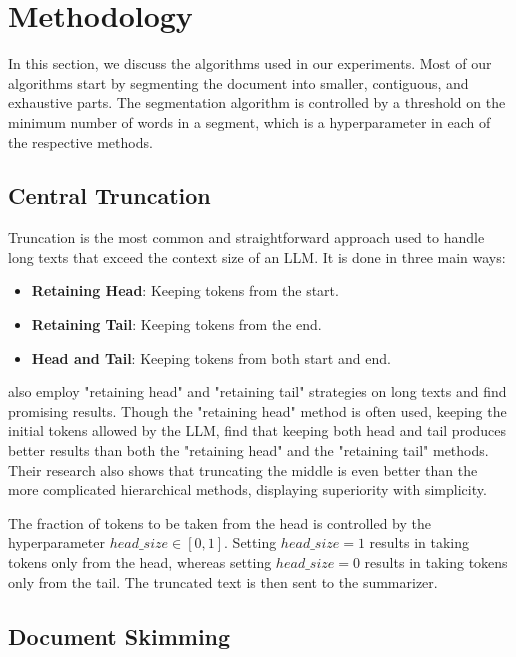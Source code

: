 \section{Methodology}
	\label{sec:methodology}

	In this section, we discuss the algorithms used in our experiments.
	Most of our algorithms start by segmenting the document into smaller, contiguous, and
	exhaustive parts.
	The segmentation algorithm is controlled by a threshold on the minimum number of words
	in a segment, which is a hyperparameter in each of the respective methods.


	\subsection{Central Truncation}
		\label{method:truncation}

		Truncation is the most common and straightforward approach used to handle long texts
		that exceed the context size of an LLM.
		It is done in three main ways:

		\begin{itemize}
			\item \textbf{Retaining Head}: Keeping tokens from the start.
			\item \textbf{Retaining Tail}: Keeping tokens from the end.
			\item \textbf{Head and Tail}: Keeping tokens from both start and end.
		\end{itemize}

		\citet{worsham-kalita-2018-genre} also employ "retaining head" and "retaining tail"
		strategies on long texts and find promising results.
		Though the "retaining head" method is often used, keeping the initial tokens allowed by
		the LLM, \citet{sun2019fine} find that keeping both head and tail produces better results
		than both the "retaining head" and the "retaining tail" methods.
		Their research also shows that truncating the middle is even better than the more
		complicated hierarchical methods, displaying superiority with simplicity.

		The fraction of tokens to be taken from the head is controlled by the hyperparameter
		$head\_size \in [0, 1]$.
		Setting $head\_size = 1$ results in taking tokens only from the head, whereas
		setting $head\_size = 0$ results in taking tokens only from the tail.
		The truncated text is then sent to the summarizer.


	\subsection{Document Skimming}
		\label{method:skimming}

